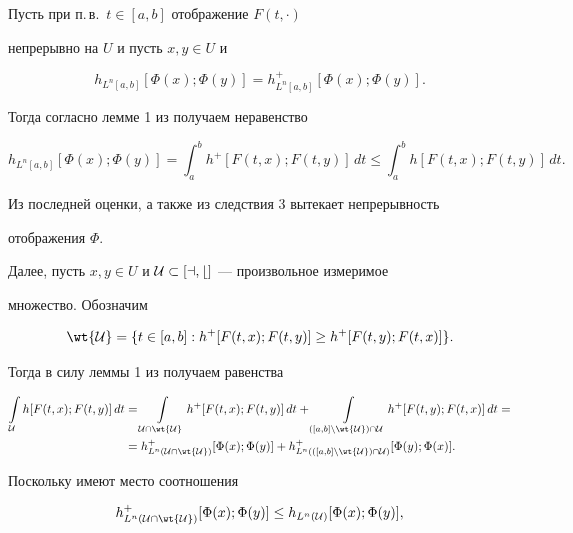 \begin{pf} Пусть при п.\,в.~$t\in[a,b]$ отображение $F(t,\cdot)$


непрерывно на $U$ и пусть $x,y\in U$ и


$$


h_{L^n[a,b]}[\Phi(x);\Phi(y)]=h^+_{L^n[a,b]}[\Phi(x);\Phi(y)].


$$


Тогда согласно лемме 1 из \cite{1} получаем неравенство


$$


h_{L^n[a,b]}[\Phi(x);\Phi(y)]=\int^b_a h^+[F(t,x);F(t,y)]\,dt\le


\int^b_ah[F(t,x);F(t,y)]\,dt.


$$


Из последней оценки, а также из следствия 3 вытекает непрерывность


отображения $\Phi$.





Далее, пусть $x,y\in U$ и $\cal U\subset[a,b]$ --- произвольное измеримое


множество. Обозначим


$$


\wt{\cal U}=\{t\in[a,b]:h^+[F(t,x);F(t,y)]\ge h^+[F(t,y);F(t,x)]\}.


$$


Тогда в силу леммы 1 из \cite{1} получаем равенства


\begin{align}


\int\limits_{\cal U}h[F(t,x);F(t,y)]\,dt&=


\int\limits_{\cal U\cap\wt{\cal U}}h^+[F(t,x);F(t,y)]\,dt+


\int\limits_{([a,b]\backslash\wt{\cal U})\cap


{\cal U}}h^+[F(t,y);F(t,x)]\,dt=\notag \\


&=h^+_{L^n(\cal U\cap\wt{\cal U})}[\Phi(x);\Phi(y)]+


h^+_{L^n(([a,b]\backslash\wt{\cal U})\cap{\cal U})}[\Phi(y);\Phi(x)].


\end{align}


Поскольку имеют место соотношения


\begin{align*}


h^+_{L^n(\cal U\cap\wt{\cal U})}[\Phi(x);\Phi(y)]&\le


h_{L^n(\cal U)}[\Phi(x);\Phi(y)],\\



\end{align*}
\end{pf}
